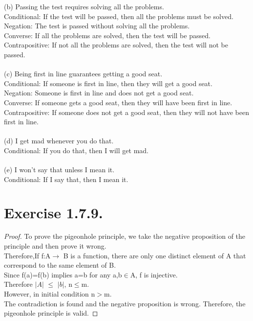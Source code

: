 \documentclass[12pt]{article}
\providecommand{\abs}[1]{\lvert #1 \rvert}
\theoremstyle{definition}
\numberwithin{equation}{subsection}
\begin{document}
(b) Passing the test requires solving all the problems.
\\Conditional: If the test will be passed, then all the problems must be solved.
\\Negation: The test is passed without solving all the problems.
\\Converse: If all the problems are solved, then the test will be passed.
\\Contrapositive: If not all the problems are solved, then the test will not be passed. \\ \\

(c) Being first in line guarantees getting a good seat.
\\Conditional: If someone is first in line, then they will get a good seat.
\\Negation: Someone is first in line and does not get a good seat.
\\Converse: If someone gets a good seat, then they will have been first in line.
\\Contrapositive: If someone does not get a good seat, then they will not have been first in line. \\ \\

(d) I get mad whenever you do that.
\\Conditional: If you do that, then I will get mad. \\ \\

(e) I won't say that unless I mean it.
\\Conditional: If I say that, then I mean it.

\section{Exercise 1.7.9.}
\begin{proof}
To prove the pigeonhole principle, we take the negative proposition of the principle and then prove it wrong.
\\Therefore,If f:A$\to$ B is a function, there are only one distinct element of A that correspond to the same element of B.
\\Since f(a)=f(b) implies a=b for any a,b$\in$A, f is injective. 
\\Therefore $\abs A $ $\leq$ $\abs b$,  n$\leq$m.
\\However, in initial condition n$>$m.
\\The contradiction is found and the negative proposition is wrong. Therefore, the pigeonhole principle is valid. 


\end{proof}
\end{document}
